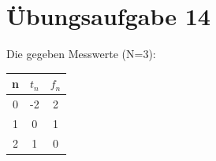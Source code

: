 

    \section*{Übungsaufgabe 14}
    Die gegeben Messwerte (N=3):\\
    \begin{tabular}{|c| c| c|}
    	\hline
		\textbf{n}	&	\textbf{$t_n$}	&	\textbf{$f_n$}\\
		\hline
		0	&	-2	&	2\\
		1	&	0	&	1\\
		2	&	1	&	0\\
		\hline
    \end{tabular}\\
